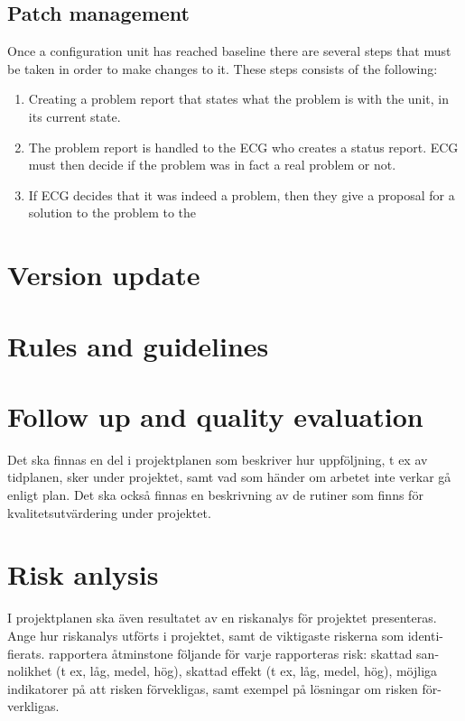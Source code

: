 \documentclass{article}
\begin{document}
    \subsection{Patch management}
        Once a configuration unit has reached baseline there are several steps
        that must be taken in order to make changes to it.
        These steps consists of the following:
        \begin{enumerate}
            \item Creating a problem report that states what the
                    problem is with the unit, in its current state.
            \item The problem report is handled to the ECG who creates a 
                    status report. ECG must then decide if the problem was
                    in fact a real problem or not.
            \item If ECG decides that it was indeed a problem, then they
                    give a proposal for a solution to the problem to
                    the 
                
        \end{enumerate}
        

    \section{Version update}

\section{Rules and guidelines} %
    
\section{Follow up and quality evaluation}

Det ska finnas en del i projektplanen som beskriver hur uppföljning, t ex av
tidplanen, sker under projektet, samt vad som händer om arbetet inte verkar
gå enligt plan. Det ska också finnas en beskrivning av de rutiner som finns för
kvalitetsutvärdering under projektet.

    

\section{Risk anlysis}

I projektplanen ska även resultatet av en riskanalys för projektet presenteras.
Ange hur riskanalys utförts i projektet, samt de viktigaste riskerna som identi-
fierats. rapportera åtminstone följande för varje rapporteras risk: skattad san-
nolikhet (t ex, låg, medel, hög), skattad effekt (t ex, låg, medel, hög), möjliga
indikatorer på att risken förvekligas, samt exempel på lösningar om risken för-
verkligas.
\end{document}
